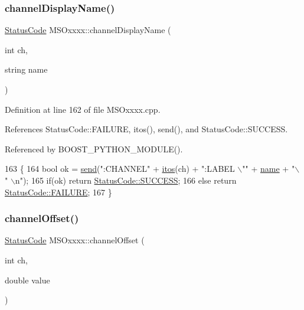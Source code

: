\subsubsection{\texorpdfstring{channel\+Display\+Name()}{channelDisplayName()}}
{\footnotesize\ttfamily \hyperlink{classStatusCode}{Status\+Code} M\+S\+Oxxxx\+::channel\+Display\+Name (\begin{DoxyParamCaption}\item[{int}]{ch,  }\item[{string}]{name }\end{DoxyParamCaption})}



Definition at line 162 of file M\+S\+Oxxxx.\+cpp.



References Status\+Code\+::\+F\+A\+I\+L\+U\+RE, itos(), send(), and Status\+Code\+::\+S\+U\+C\+C\+E\+SS.



Referenced by B\+O\+O\+S\+T\+\_\+\+P\+Y\+T\+H\+O\+N\+\_\+\+M\+O\+D\+U\+L\+E().


\begin{DoxyCode}
163 \{
164     \textcolor{keywordtype}{bool} ok = \hyperlink{classMSOxxxx_ae77668a1ae4ccb74e0ed5f2485dfdebf}{send}(\textcolor{stringliteral}{":CHANNEL"} + \hyperlink{Tools_8h_af330027dbdafb9a30768b3613c553e60}{itos}(ch) + \textcolor{stringliteral}{":LABEL \(\backslash\)""} + \hyperlink{classObject_a300f4c05dd468c7bb8b3c968868443c1}{name} + \textcolor{stringliteral}{"\(\backslash\)" \(\backslash\)n"});
165     \textcolor{keywordflow}{if}(ok)  \textcolor{keywordflow}{return} \hyperlink{classStatusCode_a6f565cbeadc76d14c72f047e5e85eb4badd0da38d3ba0d922efd1f4619bc37ad8}{StatusCode::SUCCESS};
166     \textcolor{keywordflow}{else}        \textcolor{keywordflow}{return} \hyperlink{classStatusCode_a6f565cbeadc76d14c72f047e5e85eb4ba3da73d4c469762eb9d3c960368252b26}{StatusCode::FAILURE};  
167 \}
\end{DoxyCode}
\mbox{\label{classMSOxxxx_ab77c05543d9478b140466b7505651ab8}} 
\subsubsection{\texorpdfstring{channel\+Offset()}{channelOffset()}}
{\footnotesize\ttfamily \hyperlink{classStatusCode}{Status\+Code} M\+S\+Oxxxx\+::channel\+Offset (\begin{DoxyParamCaption}\item[{int}]{ch,  }\item[{double}]{value }\end{DoxyParamCaption})}



